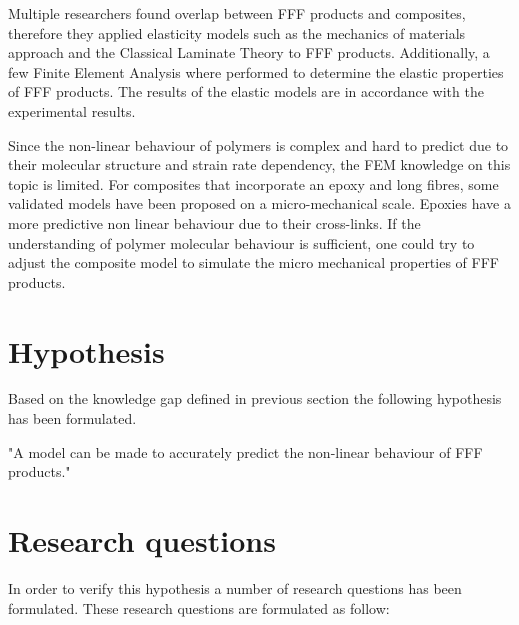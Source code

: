 Multiple researchers found overlap between FFF products and composites, therefore they applied elasticity models such as the mechanics of materials approach and the Classical Laminate Theory to FFF products. Additionally, a few Finite Element Analysis where performed to determine the elastic properties of FFF products. The results of the elastic models are in accordance with the experimental results.

Since the non-linear behaviour of polymers is complex and hard to predict due to their molecular structure and strain rate dependency, the FEM knowledge on this topic is limited. For composites that incorporate an epoxy and long fibres, some validated models have been proposed on a micro-mechanical scale.  Epoxies have a more predictive non linear behaviour due to their cross-links. If the understanding of polymer molecular behaviour is sufficient, one could try to adjust the composite model to simulate the micro mechanical properties of FFF products. 

\section{Hypothesis}
Based on the knowledge gap defined in previous section the following hypothesis has been formulated.

"A model can be made to accurately predict the non-linear behaviour of FFF products."

\section{Research questions}
    \label{Research questions}
In order to verify this hypothesis a number of research questions has been formulated. These research questions are formulated as follow:

